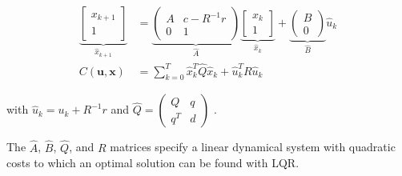 \documentclass[letterpaper, 10pt, english, conference]{IEEEtran}
\begin{document}
\begin{align*}
\underbrace{\left[\begin{matrix}x_{k+1}\\
1
\end{matrix}\right]}_{\hat{x}_{k+1}} & =\underbrace{\left(\begin{matrix}A & c-R^{-1}r\\
0 & 1
\end{matrix}\right)}_{\hat{A}}\underbrace{\left[\begin{matrix}x_{k}\\
1
\end{matrix}\right]}_{\hat{x}_{k}}+\underbrace{\left(\begin{matrix}B\\
0
\end{matrix}\right)}_{\hat{B}}\hat{u}_{k}\\
C\left(\mathbf{u},\mathbf{x}\right) & =\sum_{k=0}^{T}\hat{x}_{k}^{T}\hat{Q}\hat{x}_{k}+\hat{u}_{k}^{T}R\hat{u}_{k}
\end{align*}


with $\hat{u}_{k}=u_{k}+R^{-1}r$ and $\hat{Q}=\left(\begin{matrix}Q & q\\
q^{T} & d
\end{matrix}\right)$ . 

\begin{comment}
$\left(\begin{matrix}x\\
1
\end{matrix}\right)^{T}\left(\begin{matrix}Q & q\\
q^{T} & \eta_{1}
\end{matrix}\right)\left(\begin{matrix}x\\
1
\end{matrix}\right)=\left(\begin{matrix}x\\
1
\end{matrix}\right)^{T}\left(\begin{matrix}Qx+q\\
q^{T}x+\eta_{1}
\end{matrix}\right)=x^{T}Qx+x^{T}q+q^{T}x+d$
\end{comment}


The $\hat{A}$, $\hat{B}$, $\hat{Q}$, and $R$ matrices specify
a linear dynamical system with quadratic costs to which an optimal
solution can be found with LQR. 
\end{document}
